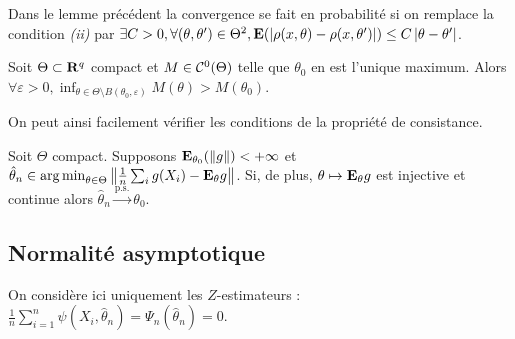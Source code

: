 	\begin{lem}
		Dans le lemme précédent la convergence se fait en probabilité si on remplace la condition \textit{(ii)} par $\exists C > 0, \forall (\theta,\theta') \in \Theta^2, \mathbf{E}(\left\lvert\rho(x,\theta) - \rho(x,\theta')\right\rvert) \leq C \left\lvert\theta - \theta'\right\rvert$.
	\end{lem}

	\begin{lem}
		Soit $\Theta \subset \mathbf{R}^q$ compact et $M \in \mathcal{C}^0(\Theta)$ telle que $\theta_0$ en est l'unique maximum.
		Alors $\forall \varepsilon > 0, \inf_{\theta \in \Theta \setminus B(\theta_0,\varepsilon)} M(\theta) > M(\theta_0)$.
	\end{lem}
	
	On peut ainsi facilement vérifier les conditions de la propriété de consistance.

	\begin{pop}
		Soit $\Theta$ compact.
		Supposons $\mathbf{E}_{\theta_0} (\left\lVert g\right\rVert) < +\infty$ et $\hat{\theta}_n \in \operatorname{arg\, min}_{\theta \in \Theta} \left\lVert\frac{1}{n} \sum_i g(X_i) - \mathbf{E}_{\theta} g\right\rVert$.
		Si, de plus, $\theta \mapsto \mathbf{E}_{\theta} g$ est injective et continue alors $\hat{\theta}_n \overset{\text{p.s.}}{\longrightarrow} \theta_0$.
	\end{pop}


\subsection{Normalité asymptotique}

	On considère ici uniquement les $Z$-estimateurs : $\frac{1}{n} \sum_{i = 1}^n \psi(X_i,\hat{\theta}_n) = \Psi_n(\hat{\theta}_n) = 0$.

